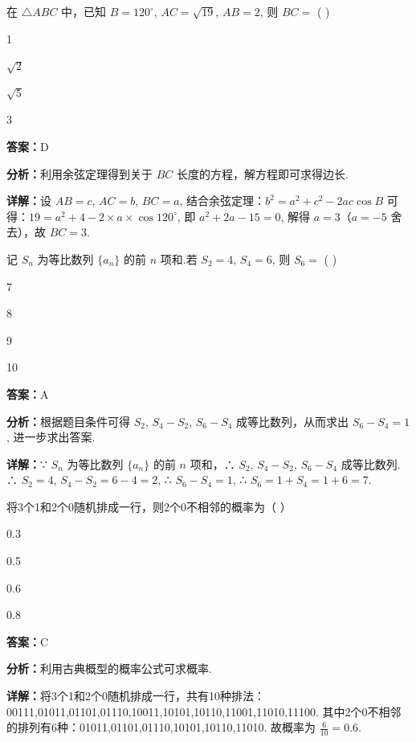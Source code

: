 \begin{question}[points=5]
在 $\triangle ABC$ 中，已知 $B=120^{\circ}$, $AC=\sqrt{19}$, $AB=2$, 则 $BC=$ ( )
\begin{choices}
  \item 1
  \item $\sqrt{2}$
  \item $\sqrt{5}$
  \item 3
\end{choices}
\begin{solution}
\textbf{答案：}D

\textbf{分析：}利用余弦定理得到关于 $BC$ 长度的方程，解方程即可求得边长.

\textbf{详解：}设 $AB=c$, $AC=b$, $BC=a$, 结合余弦定理：$b^2 = a^2 + c^2 - 2ac \cos B$ 可得：$19 = a^2 + 4 - 2 \times a \times \cos 120^{\circ}$, 即 $a^2 + 2a -15 = 0$, 解得 $a=3$（$a=-5$ 舍去），故 $BC=3$.
\end{solution}
\end{question}

\begin{question}[points=5]
记 $S_n$ 为等比数列 $\{a_n\}$ 的前 $n$ 项和.若 $S_2=4$, $S_4=6$, 则 $S_6=$ ( )
\begin{choices}
  \item 7
  \item 8
  \item 9
  \item 10
\end{choices}
\begin{solution}
\textbf{答案：}A

\textbf{分析：}根据题目条件可得 $S_2$, $S_4-S_2$, $S_6-S_4$ 成等比数列，从而求出 $S_6-S_4=1$, 进一步求出答案.

\textbf{详解：}∵ $S_n$ 为等比数列 $\{a_n\}$ 的前 $n$ 项和，∴ $S_2$, $S_4-S_2$, $S_6-S_4$ 成等比数列. ∴ $S_2=4$, $S_4-S_2=6-4=2$, ∴ $S_6-S_4=1$, ∴ $S_6=1+S_4=1+6=7$.
\end{solution}
\end{question}

\begin{question}[points=5]
将3个1和2个0随机排成一行，则2个0不相邻的概率为（ ）
\begin{choices}
  \item 0.3
  \item 0.5
  \item 0.6
  \item 0.8
\end{choices}
\begin{solution}
\textbf{答案：}C

\textbf{分析：}利用古典概型的概率公式可求概率.

\textbf{详解：}将3个1和2个0随机排成一行，共有10种排法：00111,01011,01101,01110,10011,10101,10110,11001,11010,11100. 其中2个0不相邻的排列有6种：01011,01101,01110,10101,10110,11010. 故概率为 $\frac{6}{10}=0.6$.
\end{solution}
\end{question}

